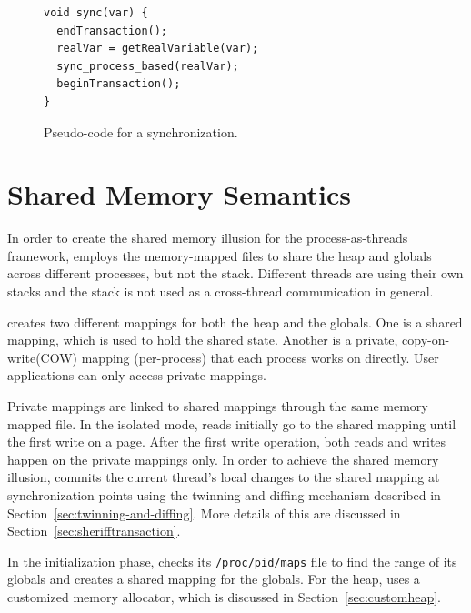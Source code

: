 \begin{figure}[!t]
\small
\begin{lstlisting}[style=tt]
void sync(var) {
  endTransaction();
  realVar = getRealVariable(var);
  sync_process_based(realVar);	
  beginTransaction();
}
\end{lstlisting}
\caption{Pseudo-code for a synchronization.\label{fig:synccode}}
\end{figure}

\section{Shared Memory Semantics}
\label{sec:sharedmemory}

In order to create the shared memory illusion for the process-as-threads framework, \sheriff{} employs the memory-mapped files to share the heap and globals across different processes, but not the stack. Different threads are using their own stacks and the stack is not used as a cross-thread communication in general.

\sheriff{} creates two different mappings for both the heap and the globals. One is a shared mapping, which is used to hold the shared state. Another is a private, copy-on-write(COW) mapping (per-process) that each process works on directly. User applications can only access  private mappings. 

Private mappings are linked to shared mappings through the same memory mapped file. In the isolated mode, reads initially go to the shared mapping until the first write on a page. After the first write operation, both reads and writes happen on the private mappings only. In order to achieve the shared memory illusion, \sheriff{} commits the current thread's local changes to the shared mapping at synchronization points using the twinning-and-diffing mechanism described in Section~\ref{sec:twinning-and-diffing}. More details of this are discussed in Section~\ref{sec:sherifftransaction}.

In the initialization phase, \sheriff{} checks its \texttt{/proc/pid/maps} file to find the range of its globals and creates a shared mapping for the globals. For the heap, \sheriff{} uses a customized memory allocator, which is discussed in Section~\ref{sec:customheap}. 

